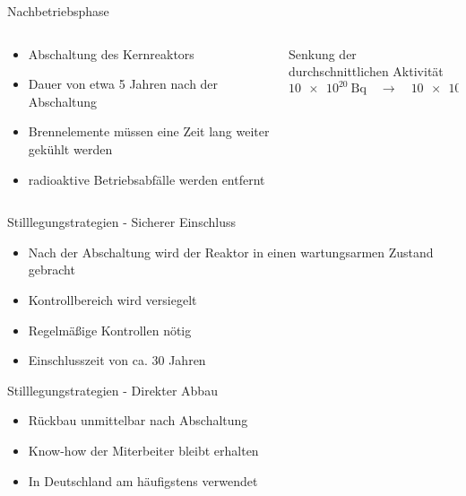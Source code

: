 \begin{frame}{ Nachbetriebsphase }
  \begin{columns}

    \begin{column}{0.48\textwidth}

        \begin{itemize}
          \setlength\itemsep{1.2em}
          \item{ Abschaltung des Kernreaktors }
          \item{ Dauer von etwa 5 Jahren nach der Abschaltung}
          \item{ Brennelemente müssen eine Zeit lang weiter gekühlt werden }
          \item{ radioaktive Betriebsabfälle werden entfernt }
        \end{itemize}

    \end{column}

    \begin{column}{0.48\textwidth}
      Senkung der durchschnittlichen Aktivität
      \begin{equation*}
        \SI{10e20}{\becquerel} \quad \rightarrow  \quad \SI{10e16}{\becquerel}
      \end{equation*}
    \end{column}

  \end{columns}
\end{frame}



\begin{frame}{Stilllegungstrategien - Sicherer Einschluss}
  \begin{itemize}
    \setlength\itemsep{1.2em}
    \item{ Nach der Abschaltung wird der Reaktor in einen wartungsarmen Zustand gebracht} 
    \item{ Kontrollbereich wird versiegelt}
    \item{ Regelmäßige Kontrollen nötig}
    \item{ Einschlusszeit von ca. $30$ Jahren}
  \end{itemize}
\end{frame}



\begin{frame}{Stilllegungstrategien - Direkter Abbau}
   \begin{itemize}
    \setlength\itemsep{1.2em}
      \item{ Rückbau unmittelbar nach Abschaltung }
      \item{ Know-how der Miterbeiter bleibt erhalten}
      \item{ In Deutschland am häufigstens verwendet}
  \end{itemize}
\end{frame}



